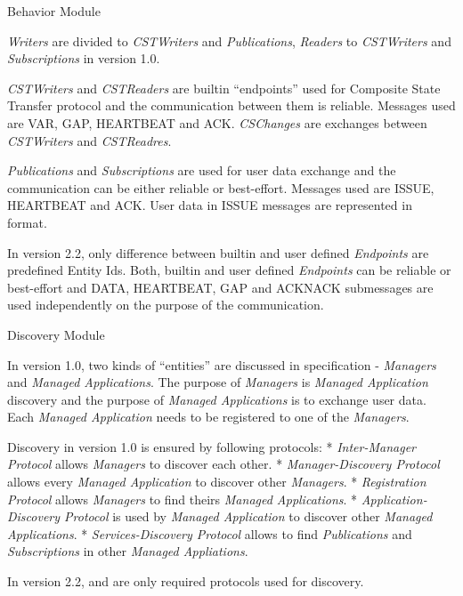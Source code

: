 \secc Behavior Module

{\em Writers} are divided to {\em CSTWriters} and {\em Publications}, {\em Readers} to {\em CSTWriters} and {\em Subscriptions} in version 1.0.

{\em CSTWriters} and {\em CSTReaders} are builtin ``endpoints'' used for Composite State Transfer protocol and the communication between them is reliable. Messages used are VAR, GAP, HEARTBEAT and ACK. {\em CSChanges} are exchanges between {\em CSTWriters} and {\em CSTReadres}.

{\em Publications} and {\em Subscriptions} are used for user data exchange and the communication can be either reliable or best-effort. Messages used are ISSUE, HEARTBEAT and ACK. User data in ISSUE messages are represented in  format.

In version 2.2, only difference between builtin and user defined {\em Endpoints} are predefined Entity Ids. Both, builtin and user defined {\em Endpoints} can be reliable or best-effort and DATA, HEARTBEAT, GAP and ACKNACK submessages are used independently on the purpose of the communication.

\secc Discovery Module

In version 1.0, two kinds of ``entities'' are discussed in specification - {\em Managers} and {\em Managed Applications}. The purpose of {\em Managers} is {\em Managed Application} discovery and the purpose of {\em Managed Applications} is to exchange user data. Each {\em Managed Application} needs to be registered to one of the {\em Managers}.

Discovery in version 1.0 is ensured by following protocols:
\begitems
* {\em Inter-Manager Protocol} allows {\em Managers} to discover each other.
* {\em Manager-Discovery Protocol} allows every {\em Managed Application} to discover other {\em Managers}.
* {\em Registration Protocol} allows {\em Managers} to find theirs {\em Managed Applications}.
* {\em Application-Discovery Protocol} is used by {\em Managed Application} to discover other {\em Managed Applications}.
* {\em Services-Discovery Protocol} allows to find {\em Publications} and {\em Subscriptions} in other {\em Managed Appliations}.
\enditems

In version 2.2,  and  are only required protocols used for discovery.

